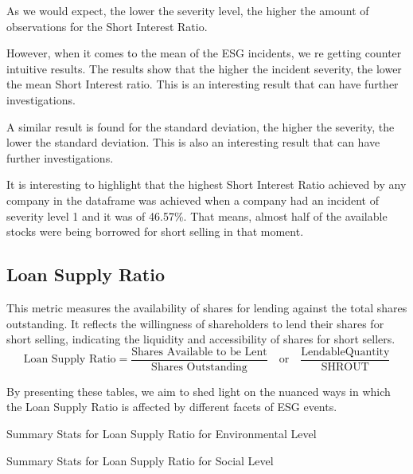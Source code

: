 As we would expect, the lower the severity level, the higher the amount of observations for the Short Interest Ratio.

However, when it comes to the mean of the ESG incidents, we re getting counter intuitive results. The results show that the higher the incident severity, the lower the mean Short Interest ratio. This is an interesting result that can have further investigations.

A similar result is found for the standard deviation, the higher the severity, the lower the standard deviation. This is also an interesting result that can have further investigations.

It is interesting to highlight that the highest Short Interest Ratio achieved by any company in the dataframe was achieved when a company had an incident of severity level 1 and it was of 46.57\%. That means, almost half of the available stocks were being borrowed for short selling in that moment.


\subsection{Loan Supply Ratio}


This metric measures the availability of shares for lending against the total shares outstanding. It reflects the willingness of shareholders to lend their shares for short selling, indicating the liquidity and accessibility of shares for short sellers.
 \begin{equation}
	\text{Loan Supply Ratio} = \frac{\text{Shares Available to be Lent}}{\text{Shares Outstanding}} \quad \text{or} \quad \frac{\text{LendableQuantity}}{\text{SHROUT}}
	\label{eq:Loan_Supply_Ratio}
\end{equation}

By presenting these tables, we aim to shed light on the nuanced ways in which the Loan Supply Ratio is affected by different facets of ESG events.

\begin{table}[H]
\caption{Summary Stats for Loan Supply Ratio for Environmental Level}
\centering
\resizebox{\textwidth}{!}{

}
\label{table:loan_supply_ratio_environment.tex}
\end{table}

\begin{table}[H]
\caption{Summary Stats for Loan Supply Ratio for Social Level}
\centering
\resizebox{\textwidth}{!}{

}
\label{table:loan_supply_ratio_social.tex}
\end{table}

